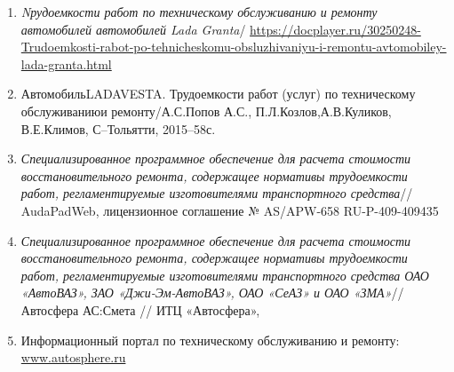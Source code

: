 \begin{enumerate}
%
\item 
\emph{Nрудоемкости работ по техническому обслуживанию и ремонту автомобилей автомобилей Lada  Granta}/   \url{https://docplayer.ru/30250248-Trudoemkosti-rabot-po-tehnicheskomu-obsluzhivaniyu-i-remontu-avtomobiley-lada-granta.html}
%
\item 
АвтомобильLADAVESTA. Трудоемкости работ (услуг) по техническому обслуживаниюи ремонту/А.С.Попов А.С., П.Л.Козлов,А.В.Куликов, В.Е.Климов, С--Тольятти, 2015--58с.
%
\item
\emph{Специализированное программное обеспечение для расчета стоимости  восстановительного ремонта, содержащее нормативы трудоемкости работ, регламентируемые изготовителями транспортного средства}//   AudaPadWeb, лицензионное соглашение № AS/APW-658  RU-P-409-409435
%
%
%
\item
\emph{Специализированное программное обеспечение для расчета стоимости  восстановительного ремонта, содержащее нормативы трудоемкости работ, регламентируемые изготовителями транспортного средства ОАО «АвтоВАЗ», ЗАО «Джи-Эм-АвтоВАЗ», ОАО «СеАЗ» и ОАО «ЗМА»}//   Автосфера АС:Смета // ИТЦ «Автосфера», \url{}


%
%
%
\item Информационный портал по техническому обслуживанию и ремонту:\\ \url{www.autosphere.ru}

\end{enumerate}
